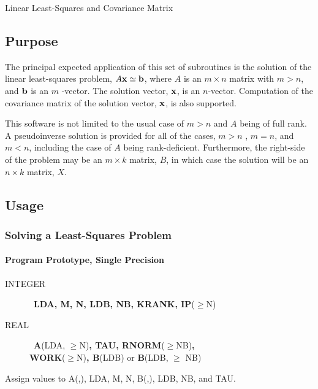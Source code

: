 \documentclass[twoside]{MATH77}
\begin{document}
 Linear Least-Squares and Covariance Matrix


\subsection{Purpose}

The principal expected application of this set of subroutines is the
solution of the linear least-squares problem, $A{\bf x} \simeq {\bf b}$,
where $A$ is an $m \times n$ matrix with $m > n$, and ${\bf b}$ is an $m$%
-vector. The solution vector, ${\bf x}$, is an $n$-vector. Computation of
the covariance matrix of the solution vector, ${\bf x}$, is also supported.

This software is not limited to the usual case of $m > n$ and $A$ being of
full rank. A pseudoinverse solution is provided for all of the cases, $m > n$%
, $m = n$, and $m < n$, including the case of $A$ being rank-deficient.
Furthermore, the right-side of the problem may be an $m \times k$ matrix, $B$,
in which case the solution will be an $n \times k$ matrix, $X$.

\subsection{Usage}

\subsubsection{Solving a Least-Squares Problem}

\paragraph{Program Prototype, Single Precision}

\begin{description}
\item[INTEGER]  \ {\bf LDA, M, N, LDB, NB, KRANK, IP}($\geq $N)

\item[REAL]  \ {\bf A}(LDA, $\geq $N){\bf , TAU, RNORM}($\geq $NB){\bf ,\\
WORK}($\geq $N){\bf , B}(LDB) or {\bf B}(LDB, $\geq $ NB)
\end{description}

Assign values to A(,), LDA, M, N, B(,), LDB, NB, and TAU.
\end{document}
